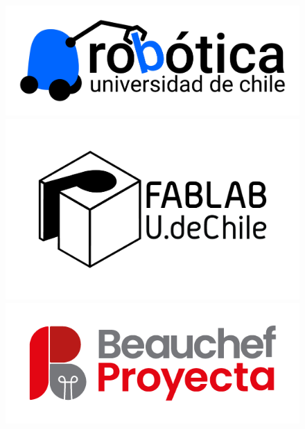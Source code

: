 \begin{titlepage}
 \begin{figure}[h!]
    \centering
    \begin{minipage}{.24\textwidth}
      \centering
      \includegraphics[width=\linewidth]{./images/logos/comrob.png}
    \end{minipage}
    \hspace{1cm}
    \begin{minipage}{.24\textwidth}
      \centering
      \includegraphics[width=\linewidth]{./images/logos/fablab.jpg}
    \end{minipage}
     \hspace{1cm}
    \begin{minipage}{.26\textwidth}
      \centering
      \includegraphics[width=\linewidth]{./images/logos/bp.png}
    \end{minipage}
  \end{figure}


\end{titlepage}
